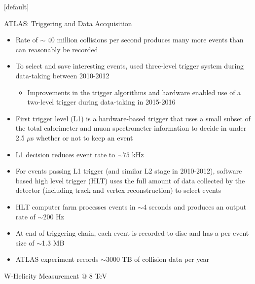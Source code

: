 \documentclass{beamer}
\begin{document}
{  \makeatletter %
  [default]
  \def\beamer@entrycode{\vspace*{-1.075\headheight}}
  \begin{frame}{ATLAS: Triggering and Data Accquisition}
    \begin{itemize}\small
    \item Rate of $\sim$ 40 million collisions per second produces many more events than can reasonably be recorded
    \item To select and save interesting events, used three-level trigger system during data-taking between 2010-2012 
      \begin{itemize}\footnotesize
      \item Improvements in the trigger algorithms and hardware enabled use of a two-level trigger during data-taking in 2015-2016
      \end{itemize}
    \item First trigger level (L1) is a hardware-based trigger that uses a small subset of the total calorimeter and muon spectrometer information to decide in under 2.5 $\mu$s whether or not to keep an event
    \item L1 decision reduces event rate to $\sim75$ kHz
    \item For events passing L1 trigger (and similar L2 stage in 2010-2012), software based high level trigger (HLT) uses the full amount of data collected by the detector (including track and vertex reconstruction) to select events
    \item HLT computer farm processes events in $\sim$4 seconds and produces an output rate of $\sim$200 Hz
    \item At end of triggering chain, each event is recorded to disc and has a per event size of $\sim$1.3 MB
    \item ATLAS experiment records $\sim$3000 TB of collision data per year
    \end{itemize}
  \end{frame}
  
  \begin{frame}
    \vspace{40pt}
    \begin{center}
      \huge
      W-Helicity Measurement @ 8 TeV
    \end{center}
  \end{frame}

}
\end{document}
